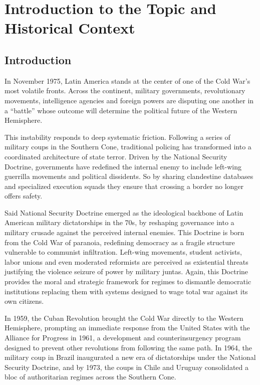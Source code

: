 \section{Introduction to the Topic and Historical Context}

\subsection{Introduction}

In November 1975, Latin America stands at the center of one of the Cold War's most volatile fronts.  Across the continent, military governments, revolutionary movements,  intelligence agencies and foreign powers  are disputing one another in a “battle” whose outcome will determine the political future of the Western Hemisphere.

This instability responds to deep systematic friction. Following a series of military coups in the Southern Cone,  traditional policing has transformed into a coordinated architecture of state terror. Driven by the National Security Doctrine, governments have redefined the internal enemy to include left-wing guerrilla movements and political dissidents. So by sharing clandestine databases and specialized execution squads they ensure that crossing a border no longer offers safety.

Said National Security Doctrine emerged as the ideological backbone of Latin American military dictatorships in the 70s,  by reshaping governance into a military crusade against the  perceived internal enemies. This Doctrine is born from the Cold War of paranoia,  redefining democracy as a fragile structure vulnerable to communist infiltration. Left-wing movements, student activists, labor unions and even moderated reformists are  perceived as existential threats justifying the violence seizure of power by military juntas.  Again, this Doctrine provides the moral and strategic framework for regimes to dismantle democratic institutions replacing them with systems designed to wage total war against its own citizens.

In 1959, the Cuban Revolution brought the Cold War directly to the Western Hemisphere, prompting an immediate response from the United States with the Alliance for Progress in 1961, a development and counterinsurgency program designed to prevent other revolutions from following the same path. In 1964, the military coup in Brazil inaugurated a new era of dictatorships under the National Security Doctrine, and by 1973, the coups in Chile and Uruguay consolidated a bloc of authoritarian regimes across the Southern Cone.

